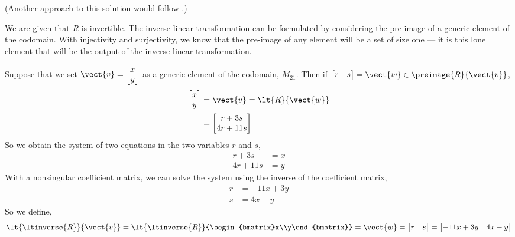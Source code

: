 (Another approach to this solution would follow .)\par
%
We are given that $R$ is invertible.  The inverse linear transformation can be formulated by considering the pre-image of a generic element of the codomain.  With injectivity and surjectivity, we know that the pre-image of any element will be a set of size one --- it is this lone element that will be the output of the inverse linear transformation.\par
%
Suppose that we set $\vect{v}=\begin{bmatrix}x\\y\end{bmatrix}$ as a generic element of the codomain, $M_{21}$.  Then if $\begin{bmatrix}r & s\end{bmatrix}=\vect{w}\in\preimage{R}{\vect{v}}$,
%
\begin{align*}
\begin{bmatrix}x\\y\end{bmatrix}&=\vect{v}=\lt{R}{\vect{w}}\\
&=
\begin{bmatrix}
r+3s\\
4r+11s
\end{bmatrix}
\end{align*}
%
So we obtain the system of two equations in the two variables $r$ and $s$,
%
\begin{align*}
r+3s&=x\\
4r+11s&=y
\end{align*}
%
With a nonsingular coefficient matrix, we can solve the system using the inverse of the coefficient matrix,
%
\begin{align*}
r&=-11x+3y\\
s&=4x-y
\end{align*}
%
So we define,
%
\begin{equation*}
\lt{\ltinverse{R}}{\vect{v}}
=\lt{\ltinverse{R}}{\begin{bmatrix}x\\y\end{bmatrix}}
=\vect{w}
=\begin{bmatrix}r & s\end{bmatrix}
=\begin{bmatrix}-11x+3y & 4x-y\end{bmatrix}
\end{equation*}
%